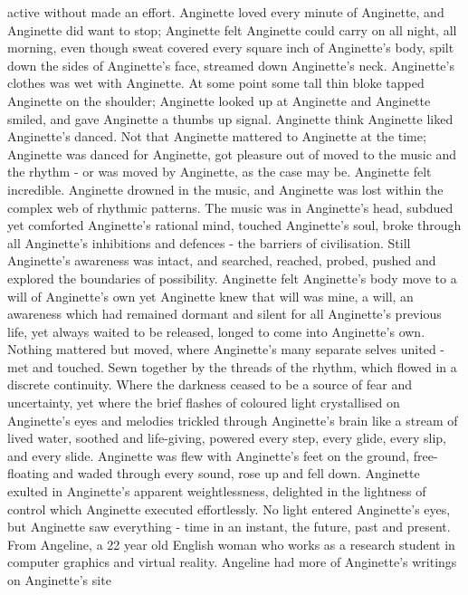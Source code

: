 \documentclass[12pt]{book}
\begin{document}
active without made an effort. Anginette loved every minute of Anginette, and Anginette did want to stop; Anginette felt Anginette could carry on all night, all morning, even though sweat covered every square inch of Anginette's body, spilt down the sides of Anginette's face, streamed down Anginette's neck. Anginette's clothes was wet with Anginette. At some point some tall thin bloke tapped Anginette on the shoulder; Anginette looked up at Anginette and Anginette smiled, and gave Anginette a thumbs up signal. Anginette think Anginette liked Anginette's danced. Not that Anginette mattered to Anginette at the time; Anginette was danced for Anginette, got pleasure out of moved to the music and the rhythm - or was moved by Anginette, as the case may be. Anginette felt incredible. Anginette drowned in the music, and Anginette was lost within the complex web of rhythmic patterns. The music was in Anginette's head, subdued yet comforted Anginette's rational mind, touched Anginette's soul, broke through all Anginette's inhibitions and defences - the barriers of civilisation. Still Anginette's awareness was intact, and searched, reached, probed, pushed and explored the boundaries of possibility. Anginette felt Anginette's body move to a will of Anginette's own yet Anginette knew that will was mine, a will, an awareness which had remained dormant and silent for all Anginette's previous life, yet always waited to be released, longed to come into Anginette's own. Nothing mattered but moved, where Anginette's many separate selves united - met and touched. Sewn together by the threads of the rhythm, which flowed in a discrete continuity. Where the darkness ceased to be a source of fear and uncertainty, yet where the brief flashes of coloured light crystallised on Anginette's eyes and melodies trickled through Anginette's brain like a stream of lived water, soothed and life-giving, powered every step, every glide, every slip, and every slide. Anginette was flew with Anginette's feet on the ground, free-floating and waded through every sound, rose up and fell down. Anginette exulted in Anginette's apparent weightlessness, delighted in the lightness of control which Anginette executed effortlessly. No light entered Anginette's eyes, but Anginette saw everything - time in an instant, the future, past and present. From Angeline, a 22 year old English woman who works as a research student in computer graphics and virtual reality. Angeline had more of Anginette's writings on Anginette's site
\end{document}
